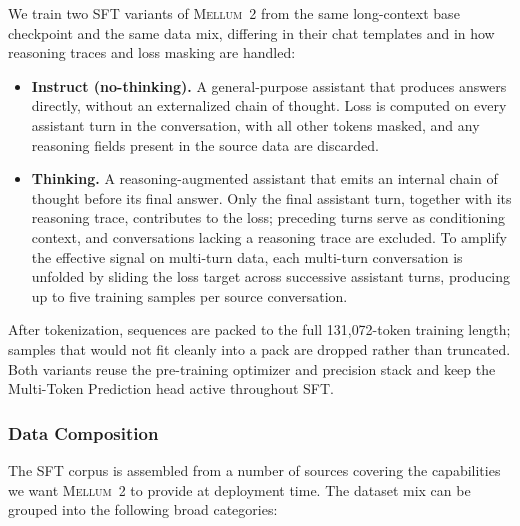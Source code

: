 \documentclass{llmxive}
\providecommand{\modelname}{\textsc{Mellum~2}\xspace}
\begin{document}
We train two SFT variants of \modelname from the same long-context base
checkpoint and the same data mix, differing in their chat templates and in
how reasoning traces and loss masking are handled:

\begin{itemize}
  \item \textbf{Instruct (no-thinking).} A general-purpose assistant that
    produces answers directly, without an externalized chain of thought.
    Loss is computed on every assistant turn in the conversation, with all
    other tokens masked, and any reasoning fields present in the source data
    are discarded.
  \item \textbf{Thinking.} A reasoning-augmented assistant that emits an
    internal chain of thought before its final answer. Only the final
    assistant turn, together with its reasoning trace, contributes to the
    loss; preceding turns serve as conditioning context, and conversations
    lacking a reasoning trace are excluded. To amplify the effective signal
    on multi-turn data, each multi-turn conversation is unfolded by sliding
    the loss target across successive assistant turns, producing up to five
    training samples per source conversation.
\end{itemize}

After tokenization, sequences are packed to the full 131{,}072-token training
length; samples that would not fit cleanly into a pack are dropped rather
than truncated. Both variants reuse the pre-training optimizer and precision
stack and keep the Multi-Token Prediction head active throughout SFT.

\subsubsection{Data Composition}
\label{sec:sft-data}

The SFT corpus is assembled from a number of sources covering the
capabilities we want \modelname to provide at deployment time. The 
dataset mix can be grouped into the following broad categories:
\end{document}
